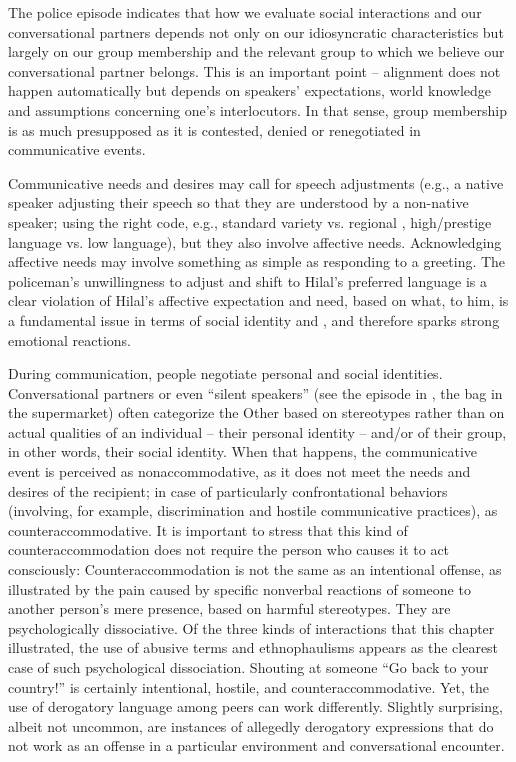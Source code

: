 \documentclass[output=paper,colorlinks,citecolor=brown]{langscibook}
\begin{document}
The police episode indicates that how we evaluate social interactions and our conversational partners depends not only on our idiosyncratic characteristics but largely on our group membership and the relevant group to which we believe our conversational partner belongs. This is an important point -- alignment does not happen automatically but depends on speakers' expectations, world knowledge and assumptions concerning one's interlocutors. In that sense, group membership is as much presupposed as it is contested, denied or renegotiated in communicative events. 

Communicative needs and desires may call for speech adjustments (e.g., a native speaker adjusting their speech so that they are understood by a non-native speaker; using the right code, e.g., standard variety vs. regional , high/prestige language vs. low language), but they also involve affective needs. Acknowledging affective needs may involve something as simple as responding to a greeting. The policeman's unwillingness to adjust and shift to Hilal's preferred language is a clear violation of Hilal's affective expectation and need, based on what, to him, is a fundamental issue in terms of social identity and , and therefore sparks strong emotional reactions. 

During communication, people negotiate personal and social identities. Conversational partners or even ``silent speakers'' (see the episode in , the bag in the supermarket) often categorize the Other based on stereotypes rather than on actual qualities of an individual -- their personal identity -- and/or of their group, in other words, their social identity. When that happens, the communicative event is perceived as nonaccommodative, as it does not meet the needs and desires of the recipient; in case of particularly confrontational behaviors (involving, for example, discrimination and hostile communicative practices), as counteraccommodative. It is important to stress that this kind of counteraccommodation does not require the person who causes it to act consciously: Counteraccommodation is not the same as an intentional offense, as illustrated by the pain caused by specific nonverbal reactions of someone to another person's mere presence, based on harmful stereotypes. They are psychologically dissociative. Of the three kinds of interactions that this chapter illustrated, the use of abusive terms and ethnophaulisms appears as the clearest case of such psychological dissociation. Shouting at someone ``Go back to your country!'' is certainly intentional, hostile, and counteraccommodative. Yet, the use of derogatory language among peers can work differently. Slightly surprising, albeit not uncommon, are instances of allegedly derogatory expressions that do not work as an offense in a particular environment and conversational encounter. 
\end{document}

